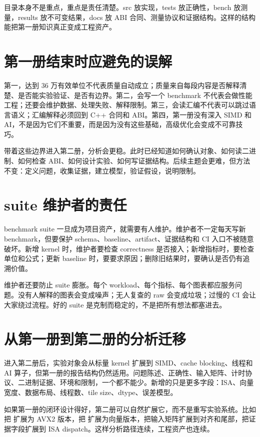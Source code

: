 目录本身不是重点，重点是责任清楚。src 放实现，tests 放正确性，bench 放测量，results 放不可变结果，docs 放 ABI 合同、测量协议和证据结构。这样的结构能把第一册知识真正变成工程资产。

\section{第一册结束时应避免的误解}

第一，达到 36 万有效单位不代表质量自动成立；质量来自每段内容是否解释清楚、是否能实验验证、是否有边界。第二，会写一个 benchmark 不代表会做性能工程；还要会维护数据、处理失败、解释限制。第三，会读汇编不代表可以跳过语言语义；汇编解释必须回到 C++ 合同和 ABI。第四，第一册没有深入 SIMD 和 AI，不是因为它们不重要，而是因为没有这些基础，高级优化会变成不可靠技巧。

带着这些边界进入第二册，分析会更稳。此时已经知道如何确认对象、如何读二进制、如何检查 ABI、如何设计实验、如何写证据结构。后续主题会更难，但方法不变：定义问题，收集证据，建立模型，验证假设，说明限制。

\section{suite 维护者的责任}

benchmark suite 一旦成为项目资产，就需要有人维护。维护者不一定每天写新 benchmark，但要保护 schema、baseline、artifact、证据结构和 CI 入口不被随意破坏。新增 kernel 时，维护者要检查 correctness 是否接入；新增指标时，要检查单位和公式；更新 baseline 时，要要求原因；删除旧结果时，要确认是否仍有追溯价值。

维护者还要防止 suite 膨胀。每个 workload、每个指标、每个图表都应服务问题。没有人解释的图表会变成噪声；无人复查的 raw 会变成垃圾；过慢的 CI 会让大家绕过流程。好的 suite 是克制而稳定的，不是把所有想法都塞进去。

\section{从第一册到第二册的分析迁移}

进入第二册后，实验对象会从标量 kernel 扩展到 SIMD、cache blocking、线程和 AI 算子，但第一册的报告结构仍然适用。问题陈述、正确性、输入矩阵、计时协议、二进制证据、环境和限制，一个都不能少。新增的只是更多字段：ISA、向量宽度、数据布局、线程数、tile size、dtype、误差模型。

如果第一册的闭环设计得好，第二册可以自然扩展它，而不是重写实验系统。比如把  扩展为 AVX2 版本，把  扩展为向量版本，把输入矩阵扩展到对齐和尾部，把证据字段扩展到 ISA dispatch。这样分析路径连续，工程资产也连续。

